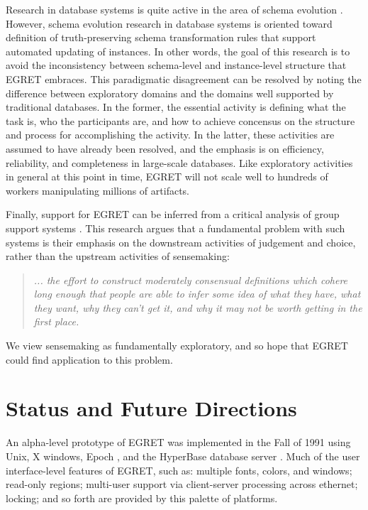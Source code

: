 Research in database systems is quite active in the area of schema evolution \cite{Skarra86,Lerner90,Banerjee87}.  However, schema evolution research in database systems is oriented toward definition of truth-preserving schema transformation rules that support automated updating of instances.  In other words, the goal of this research is to avoid the inconsistency between schema-level and instance-level structure that EGRET embraces.  This paradigmatic disagreement can be resolved by noting the difference between exploratory domains and the domains well supported by traditional databases.  In the former, the essential activity is defining what the task is, who the participants are, and how to achieve concensus on the structure and process for accomplishing the activity.  In the latter, these activities are assumed to have already been resolved, and the emphasis is on efficiency, reliability, and completeness in large-scale databases.  Like exploratory activities in general at this point in time, EGRET will not scale well to hundreds of workers manipulating millions of artifacts.

Finally, support for EGRET can be inferred from a critical analysis of group support systems \cite{Weick91}.  This research argues that a fundamental problem with such systems is their emphasis on the downstream activities of judgement and choice, rather than the upstream activities of sensemaking:
\begin{quotation}
  {\em ... the effort to construct moderately consensual definitions which cohere long enough that people are able to infer some idea of what they have, what they want, why they can't get it, and why it may not be worth getting in the first place.}
\end{quotation}
We view sensemaking as fundamentally exploratory, and so hope that EGRET could find application to this problem.

\section{Status and Future Directions}

An alpha-level prototype of EGRET was implemented in the Fall of 1991 using Unix, X windows, Epoch \cite{Love92}, and the HyperBase database server \cite{Wiil90}.  Much of the user interface-level features of EGRET, such as: multiple fonts, colors, and windows; read-only regions; multi-user support via client-server processing across ethernet; locking; and so forth are provided by this palette of platforms.

